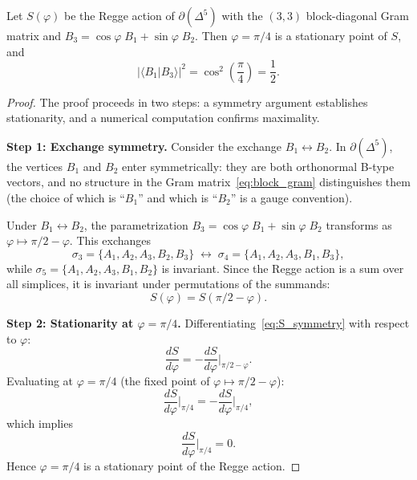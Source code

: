 \begin{theorem}\label{thm:overlap}
Let $S(\varphi)$ be the Regge action of $\partial(\Delta^5)$ with the
$(3,3)$ block-diagonal Gram matrix and
$B_3 = \cos\varphi\; B_1 + \sin\varphi\; B_2$.  Then
$\varphi = \pi/4$ is a stationary point of $S$, and
\begin{equation}
\boxed{|\langle B_1 | B_3 \rangle|^2 = \cos^2\!\left(\frac{\pi}{4}\right) = \frac{1}{2}.}
\end{equation}
\end{theorem}

\begin{proof}
The proof proceeds in two steps: a symmetry argument establishes
stationarity, and a numerical computation confirms maximality.

\medskip\noindent\textbf{Step 1: Exchange symmetry.}
Consider the exchange $B_1 \leftrightarrow B_2$.  In
$\partial(\Delta^5)$, the vertices $B_1$ and $B_2$ enter
symmetrically: they are both orthonormal B-type vectors, and no
structure in the Gram matrix~\eqref{eq:block_gram} distinguishes
them (the choice of which is ``$B_1$'' and which is ``$B_2$'' is a
gauge convention).

Under $B_1 \leftrightarrow B_2$, the parametrization
$B_3 = \cos\varphi\; B_1 + \sin\varphi\; B_2$ transforms as
$\varphi \mapsto \pi/2 - \varphi$.  This exchanges
\begin{equation}
\sigma_3 = \{A_1,A_2,A_3,B_2,B_3\}
\;\longleftrightarrow\;
\sigma_4 = \{A_1,A_2,A_3,B_1,B_3\},
\end{equation}
while $\sigma_5 = \{A_1,A_2,A_3,B_1,B_2\}$ is invariant.  Since the
Regge action is a sum over all simplices, it is invariant under
permutations of the summands:
\begin{equation}\label{eq:S_symmetry}
S(\varphi) = S(\pi/2 - \varphi).
\end{equation}

\medskip\noindent\textbf{Step 2: Stationarity at $\varphi = \pi/4$.}
Differentiating~\eqref{eq:S_symmetry} with respect to $\varphi$:
\begin{equation}
\frac{dS}{d\varphi} = -\frac{dS}{d\varphi}\bigg|_{\pi/2-\varphi}.
\end{equation}
Evaluating at $\varphi = \pi/4$ (the fixed point of
$\varphi \mapsto \pi/2 - \varphi$):
\begin{equation}
\frac{dS}{d\varphi}\bigg|_{\pi/4}
= -\frac{dS}{d\varphi}\bigg|_{\pi/4},
\end{equation}
which implies
\begin{equation}
\frac{dS}{d\varphi}\bigg|_{\pi/4} = 0.
\end{equation}
Hence $\varphi = \pi/4$ is a stationary point of the Regge action.


\end{proof}
